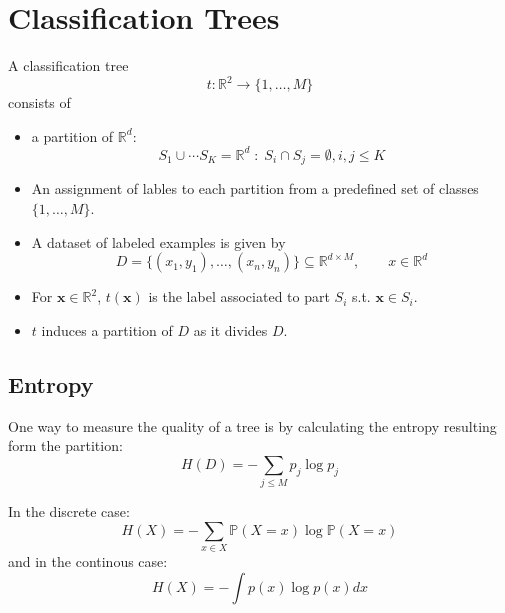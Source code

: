 \section{Classification Trees}
A classification tree
\noindent\begin{equation*}
    t: \mathbb{R}^2 \to \{1,\ldots, M\}
\end{equation*} consists of
\begin{itemize}
    \item a partition of $\mathbb{R}^d$:
          \noindent\begin{equation*}
              S_1\cup \cdots S_K = \mathbb{R}^d \;:\; S_i\cap S_j=\emptyset , i,j\leq K
          \end{equation*}
    \item An assignment of lables to each partition from a predefined set of classes $\{1,\ldots, M\}$.
    \item A dataset of labeled examples is given by
          \noindent\begin{equation*}
              D=\{(x_{1},y_{1}),\ldots,(x_{n},y_{n})\}\subseteq\mathbb{R}^{d\times M},\qquad x\in \mathbb{R}^d
          \end{equation*}
\end{itemize}


\begin{itemize}
    \item For $\mathbf{x}\in\mathbb{R}^2$, $t(\mathbf{x})$ is the label associated to part $S_i$ s.t. $\mathbf{x}\in S_i$.
    \item $t$ induces a partition of $D$ as it divides $D$.
\end{itemize}


\subsection{Entropy}
One way to measure the quality of a tree is by calculating the entropy resulting form the partition:
\noindent\begin{equation*}
    H(D)=-\sum_{j\leq M}p_j\log p_j
\end{equation*}

In the discrete case:
\noindent\begin{equation*}
    H(X)=-\sum_{x\in X}\mathbb{P}(X=x)\log\mathbb{P}(X=x)
\end{equation*}
and in the continous case:
\noindent\begin{equation*}
    H(X)=-\int p(x)\log p(x) dx
\end{equation*}

